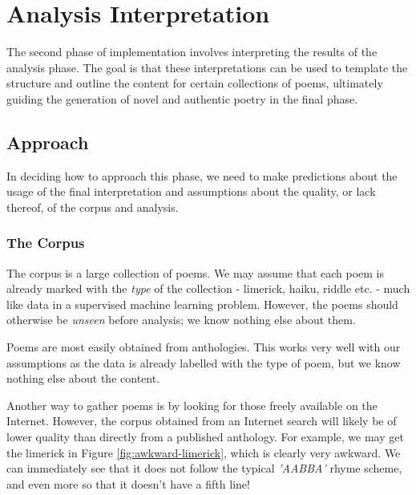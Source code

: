 \chapter{Analysis Interpretation}
\ifpdf
    \graphicspath{{Implementation/ImplementationFigs/PNG/}{Implementation/ImplementationFigs/PDF/}{Implementation/ImplementationFigs/}}
\else
    \graphicspath{{Implementation/ImplementationFigs/EPS/}{Implementation/ImplementationFigs/}}
\fi

The second phase of implementation involves interpreting the results of the analysis phase. The goal is that these interpretations can be used to template the structure and outline the content for certain collections of poems, ultimately guiding the generation of novel and authentic poetry in the final phase.

\section{Approach}
\label{sec:balance-priorities}

In deciding how to approach this phase, we need to make predictions about the usage of the final interpretation and assumptions about the quality, or lack thereof, of the corpus and analysis.


\subsection{The Corpus}

The corpus is a large collection of poems. We may assume that each poem is already marked with the \textit{type} of the collection - limerick, haiku, riddle etc. - much like data in a supervised machine learning problem. However, the poems should otherwise be \textit{unseen} before analysis; we know nothing else about them. 

Poems are most easily obtained from anthologies. This works very well with our assumptions as the data is already labelled with the type of poem, but we know nothing else about the content.

Another way to gather poems is by looking for those freely available on the Internet. However, the corpus obtained from an Internet search will likely be of lower quality than directly from a published anthology. For example, we may get the limerick in Figure \ref{fig:awkward-limerick}, which is clearly very awkward. We can immediately see that it does not follow the typical \textit{'AABBA'} rhyme scheme, and even more so that it doesn't have a fifth line!

